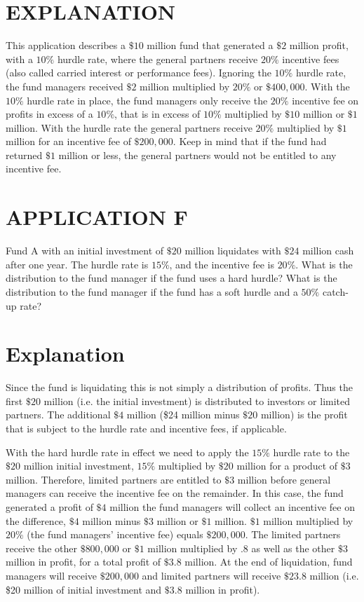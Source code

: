 \documentclass[11pt]{article}
\begin{document}
\section*{EXPLANATION}
This application describes a $\$ 10$ million fund that generated a $\$ 2$ million profit, with a $10 \%$ hurdle rate, where the general partners receive $20 \%$ incentive fees (also called carried interest or performance fees). Ignoring the $10 \%$ hurdle rate, the fund managers received $\$ 2$ million multiplied by $20 \%$ or $\$ 400,000$. With the $10 \%$ hurdle rate in place, the fund managers only receive the $20 \%$ incentive fee on profits in excess of a $10 \%$, that is in excess of $10 \%$ multiplied by $\$ 10$ million or $\$ 1$ million. With the hurdle rate the general partners receive $20 \%$ multiplied by $\$ 1$ million for an incentive fee of $\$ 200,000$. Keep in mind that if the fund had returned $\$ 1$ million or less, the general partners would not be entitled to any incentive fee.

\section*{APPLICATION F}
Fund A with an initial investment of $\$ 20$ million liquidates with $\$ 24$ million cash after one year. The hurdle rate is $15 \%$, and the incentive fee is $20 \%$. What is the distribution to the fund manager if the fund uses a hard hurdle? What is the distribution to the fund manager if the fund has a soft hurdle and a $50 \%$ catch-up rate?

\section*{Explanation}
Since the fund is liquidating this is not simply a distribution of profits. Thus the first $\$ 20$ million (i.e. the initial investment) is distributed to investors or limited partners. The additional $\$ 4$ million (\$24 million minus $\$ 20$ million) is the profit that is subject to the hurdle rate and incentive fees, if applicable.

With the hard hurdle rate in effect we need to apply the $15 \%$ hurdle rate to the $\$ 20$ million initial investment, $15 \%$ multiplied by $\$ 20$ million for a product of $\$ 3$ million. Therefore, limited partners are entitled to $\$ 3$ million before general managers can receive the incentive fee on the remainder. In this case, the fund generated a profit of $\$ 4$ million the fund managers will collect an incentive fee on the difference, $\$ 4$ million minus $\$ 3$ million or $\$ 1$ million. $\$ 1$ million multiplied by $20 \%$ (the fund managers' incentive fee) equals $\$ 200,000$. The limited partners receive the other $\$ 800,000$ or $\$ 1$ million multiplied by .8 as well as the other $\$ 3$ million in profit, for a total profit of $\$ 3.8$ million. At the end of liquidation, fund managers will receive $\$ 200,000$ and limited partners will receive $\$ 23.8$ million (i.e. \$20 million of initial investment and $\$ 3.8$ million in profit).
\end{document}
